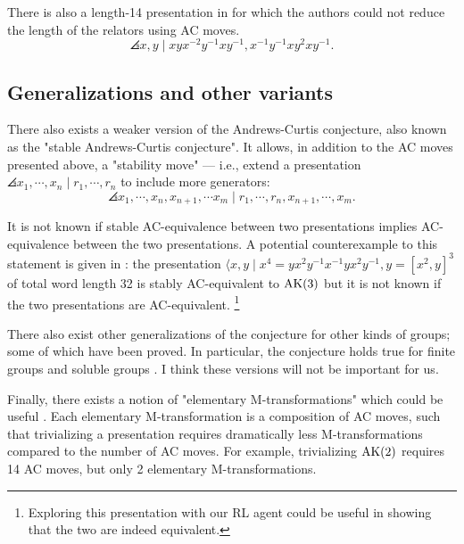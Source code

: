 There is also a length-14 presentation in \cite{MMS} for which the authors could not reduce the length of the relators using AC moves.
\[
\angles{x, y \mid xyx^{-2}y^{-1} xy^{-1}, x^{-1} y^{-1} x y^2 x y^{-1}}.
\]

\subsection{Generalizations and other variants}

There also exists a weaker version of the Andrews-Curtis conjecture, also known as the "stable Andrews-Curtis conjecture".
It allows, in addition to the AC moves presented above, a "stability move" --- i.e., extend a presentation $\angles{x_1, \cdots, x_n \mid r_1, \cdots, r_n}$ to include more generators:
\[
\angles{x_1, \cdots, x_n, x_{n+1}, \cdots x_m \mid r_1, \cdots, r_n, x_{n+1}, \cdots, x_m}.
\]

It is not known if stable AC-equivalence between two presentations implies AC-equivalence between the two presentations.
A potential counterexample to this statement is given in \cite{MMS}: the presentation $\langle x, y \mid x^4 = y x^2 y^{-1} x^{-1} y x^2 y^{-1}, y = [x^2, y]^3 $ of total word length 32 is stably AC-equivalent to $\text{AK}(3)$ but it is not known if the two presentations are AC-equivalent.
\footnote{Exploring this presentation with our RL agent could be useful in showing that the two are indeed equivalent.}
\newline

There also exist other generalizations of the conjecture for other kinds of groups; some of which have been proved.
In particular, the conjecture holds true for finite groups and soluble groups \cite{Borovik, Guyot}.
I think these versions will not be important for us.
\newline

Finally, there exists a notion of "elementary M-transformations" which could be useful \cite{BurnsI, BurnsII}.
Each elementary M-transformation is a composition of AC moves, such that trivializing a presentation requires dramatically less M-transformations compared to the number of AC moves.
For example, trivializing $\text{AK}(2)$ requires 14 AC moves, but only 2 elementary M-transformations.